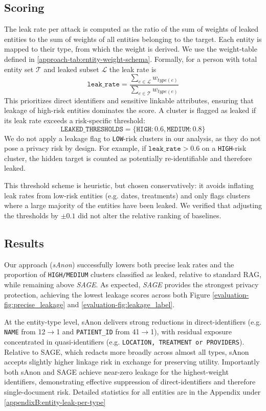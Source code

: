\subsection{Scoring}
The leak rate per attack is computed as the ratio of the sum of weights of leaked entities to the sum of weights of all entities belonging to the target. Each entity is mapped to their type, from which the weight is derived. We use the weight-table defined in \ref{approach-tab:entity-weight-schema}. Formally, for a person with total entity set $\mathcal{T}$ and leaked subset $\mathcal{L}$ the leak rate is
\[
  \texttt{leak\_rate} = \frac{\sum_{e\in \mathcal{L}} w_{type(e)}}{\sum_{e \in \mathcal{T}} w_{type(e)}}
\]
This  prioritizes direct identifiers and sensitive linkable attributes, ensuring that leakage of high-risk entities dominates the score. A cluster is flagged as leaked if its leak rate exceeds a risk-specific threshold:
\[
\texttt{LEAKED\_THRESHOLDS} = \{\texttt{HIGH}: 0.6, \texttt{MEDIUM}: 0.8\}
\]
We do not apply a leakage flag to \texttt{LOW}-risk clusters in our analysis, as they do not pose a privacy risk by design. For example, if $\texttt{leak\_rate} > 0.6$ on a \texttt{HIGH}-risk cluster, the hidden target is counted as potentially re-identifiable and therefore leaked.

This threshold scheme is heuristic, but chosen conservatively: it avoids inflating leak rates from low-risk entities (e.g. dates, treatments) and only flags clusters where a large majority of the entities have been leaked. We verified that adjusting the thresholds by $\pm 0.1$ did not alter the relative ranking of baselines.

\subsection{Results}
Our approach (\textit{sAnon}) successfully lowers both precise leak rates  and the proportion of \texttt{HIGH/MEDIUM} clusters classified as leaked, relative to standard RAG, while remaining above \textit{SAGE}. As expected, \textit{SAGE} provides the strongest privacy protection, achieving the lowest leakage scores across both Figure \ref{evaluation-fig:precise_leakage} and  \ref{evaluation-fig:leakage_label}. 

At the entity-type level, sAnon delivers strong reductions in direct-identifiers (e.g. \texttt{NAME} from 12$\rightarrow$1 and \texttt{PATIENT\_ID} from 41$\rightarrow$1), with residual exposure concentrated in quasi-identifiers (e.g. \texttt{LOCATION, TREATMENT or PROVIDERS}). Relative to SAGE, which redacts more broadly across almost all types, sAnon accepts slightly higher linkage risk in exchange for preserving utility. Importantly both sAnon and SAGE achieve near-zero leakage for the highest-weight identifiers, demonstrating effective suppression of direct-identifiers and therefore single-document risk. Detailed statistics for all entities are in the Appendix under \ref{appendixB:entity-leak-per-type}

